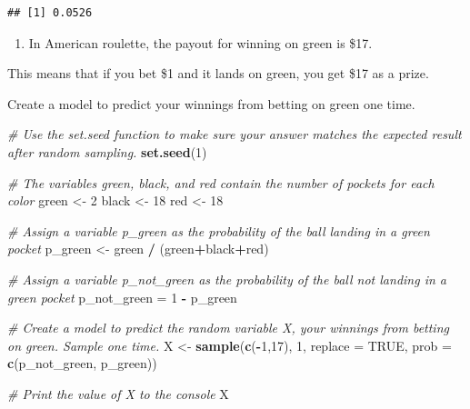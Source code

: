 \documentclass[
]{article}
\newenvironment{Shaded}{\begin{snugshade}}{\end{snugshade}}
\newcommand{\CommentTok}[1]{\textcolor[rgb]{0.56,0.35,0.01}{\textit{#1}}}
\newcommand{\DataTypeTok}[1]{\textcolor[rgb]{0.13,0.29,0.53}{#1}}
\newcommand{\DecValTok}[1]{\textcolor[rgb]{0.00,0.00,0.81}{#1}}
\newcommand{\KeywordTok}[1]{\textcolor[rgb]{0.13,0.29,0.53}{\textbf{#1}}}
\newcommand{\NormalTok}[1]{#1}
\newcommand{\OperatorTok}[1]{\textcolor[rgb]{0.81,0.36,0.00}{\textbf{#1}}}
\newcommand{\OtherTok}[1]{\textcolor[rgb]{0.56,0.35,0.01}{#1}}
\newcommand{\StringTok}[1]{\textcolor[rgb]{0.31,0.60,0.02}{#1}}
\providecommand{\tightlist}{%
  \setlength{\itemsep}{0pt}\setlength{\parskip}{0pt}}
\begin{document}
\begin{verbatim}
## [1] 0.0526
\end{verbatim}

\begin{enumerate}
\def\labelenumi{\arabic{enumi}.}
\setcounter{enumi}{1}
\tightlist
\item
  In American roulette, the payout for winning on green is \$17.
\end{enumerate}

This means that if you bet \$1 and it lands on green, you get \$17 as a
prize.

Create a model to predict your winnings from betting on green one time.

\begin{Shaded}
\begin{Highlighting}[]
\CommentTok{\# Use the \textasciigrave{}set.seed\textasciigrave{} function to make sure your answer matches the expected result after random sampling.}
\KeywordTok{set.seed}\NormalTok{(}\DecValTok{1}\NormalTok{)}

\CommentTok{\# The variables \textquotesingle{}green\textquotesingle{}, \textquotesingle{}black\textquotesingle{}, and \textquotesingle{}red\textquotesingle{} contain the number of pockets for each color}
\NormalTok{green \textless{}{-}}\StringTok{ }\DecValTok{2}
\NormalTok{black \textless{}{-}}\StringTok{ }\DecValTok{18}
\NormalTok{red \textless{}{-}}\StringTok{ }\DecValTok{18}

\CommentTok{\# Assign a variable \textasciigrave{}p\_green\textasciigrave{} as the probability of the ball landing in a green pocket}
\NormalTok{p\_green \textless{}{-}}\StringTok{ }\NormalTok{green }\OperatorTok{/}\StringTok{ }\NormalTok{(green}\OperatorTok{+}\NormalTok{black}\OperatorTok{+}\NormalTok{red)}

\CommentTok{\# Assign a variable \textasciigrave{}p\_not\_green\textasciigrave{} as the probability of the ball not landing in a green pocket}
\NormalTok{p\_not\_green =}\StringTok{ }\DecValTok{1} \OperatorTok{{-}}\StringTok{ }\NormalTok{p\_green}


\CommentTok{\# Create a model to predict the random variable \textasciigrave{}X\textasciigrave{}, your winnings from betting on green. Sample one time.}
\NormalTok{X \textless{}{-}}\StringTok{ }\KeywordTok{sample}\NormalTok{(}\KeywordTok{c}\NormalTok{(}\OperatorTok{{-}}\DecValTok{1}\NormalTok{,}\DecValTok{17}\NormalTok{), }\DecValTok{1}\NormalTok{, }\DataTypeTok{replace =} \OtherTok{TRUE}\NormalTok{, }\DataTypeTok{prob =} \KeywordTok{c}\NormalTok{(p\_not\_green, p\_green))}

\CommentTok{\# Print the value of \textasciigrave{}X\textasciigrave{} to the console}
\NormalTok{X}
\end{Highlighting}
\end{Shaded}
\end{document}
